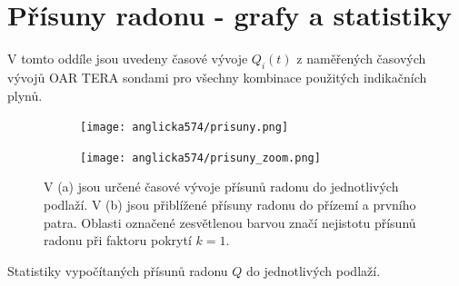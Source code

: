 \section{Přísuny radonu - grafy a statistiky}
V tomto oddíle jsou uvedeny časové vývoje $Q_i(t)$ z naměřených časových vývojů OAR TERA sondami pro všechny kombinace použitých indikačních plynů.
\begin{figure}[H]
    \begin{subfigure}{\textwidth}
        \centering
        \texttt{[image: anglicka574/prisuny.png]}
        \caption{}
        \label{fig:anglicka574_prisuny}
    \end{subfigure}
    \begin{subfigure}{\textwidth}
        \centering
        \texttt{[image: anglicka574/prisuny\_zoom.png]}
        \caption{}
        \label{fig:anglicka574_prisunyZoom}
    \end{subfigure}
    \caption{V (a) jsou určené časové vývoje přísunů radonu do jednotlivých podlaží. V (b) jsou přiblížené přísuny radonu do přízemí a prvního patra. Oblasti označené zesvětlenou barvou značí nejistotu přísunů radonu při faktoru pokrytí $k=1$.}
\end{figure}
\begin{table}[ht]
    \centering
    \caption{Statistiky vypočítaných přísunů radonu $Q$ do jednotlivých podlaží.}
    \label{tab:anglicka574_prisuny}
    
\end{table}

